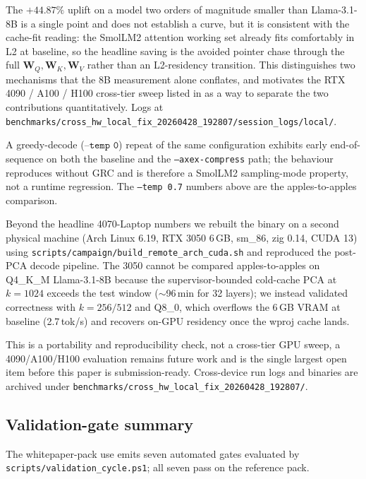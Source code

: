 \documentclass[11pt]{article}
\providecommand{\Wmat}{\mathbf{W}}
\begin{document}
The $+44.87\%$ uplift on a model two orders of magnitude smaller than
Llama-3.1-8B is a single point and does not establish a curve, but it is
consistent with the cache-fit reading: the SmolLM2 attention working set
already fits comfortably in L2 at baseline, so the headline saving is
the avoided pointer chase through the full $\Wmat_Q,\Wmat_K,\Wmat_V$
rather than an L2-residency transition. This distinguishes two
mechanisms that the 8B measurement alone conflates, and motivates the
RTX 4090 / A100 / H100 cross-tier sweep listed in
 as a way to separate the two contributions
quantitatively. Logs at
\texttt{benchmarks/cross\_hw\_local\_fix\_20260428\_192807/session\_logs/local/}.

A greedy-decode ($\texttt{--temp 0}$) repeat of the same configuration
exhibits early end-of-sequence on both the baseline and the
\texttt{--axex-compress} path; the behaviour reproduces without GRC and
is therefore a SmolLM2 sampling-mode property, not a runtime regression.
The \texttt{--temp 0.7} numbers above are the apples-to-apples
comparison.

\label{sec:second-device}

Beyond the headline 4070-Laptop numbers we rebuilt the binary on a
second physical machine (Arch Linux 6.19, RTX 3050 6\,GB, sm\_86, zig
0.14, CUDA 13) using \texttt{scripts/campaign/build\_remote\_arch\_cuda.sh}
and reproduced the post-PCA decode pipeline. The 3050 cannot be compared
apples-to-apples on Q4\_K\_M Llama-3.1-8B because the supervisor-bounded
cold-cache PCA at $k{=}1024$ exceeds the test window ($\sim$96\,min for 32
layers); we instead validated correctness with $k{=}256/512$ and Q8\_0,
which overflows the 6\,GB VRAM at baseline (2.7\,tok/s) and recovers
on-GPU residency once the wproj cache lands.

This is a portability and reproducibility check, not a cross-tier
GPU sweep, a 4090/A100/H100 evaluation remains future work and is the
single largest open item before this paper is submission-ready.
Cross-device run logs and binaries are archived under
\texttt{benchmarks/cross\_hw\_local\_fix\_20260428\_192807/}.

\subsection{Validation-gate summary}

The whitepaper-pack use emits seven automated gates evaluated by
\texttt{scripts/validation\_cycle.ps1}; all seven pass on the reference pack.
\end{document}
